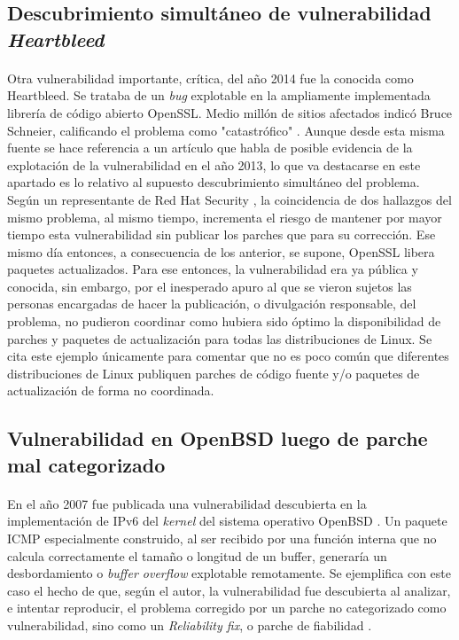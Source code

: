 \documentclass[11pt,a4paper]{article}
\begin{document}
\subsection{Descubrimiento simultáneo de vulnerabilidad \textit{Heartbleed}}

\paragraph{}Otra vulnerabilidad importante, crítica, del año 2014 fue la conocida como Heartbleed. Se trataba de un \textit{bug} explotable en la ampliamente implementada librería de código abierto OpenSSL. Medio millón de sitios afectados indicó Bruce Schneier, calificando el problema como "catastrófico" \cite{SchneierHB}. Aunque desde esta misma fuente se hace referencia a un artículo que habla de posible evidencia de la explotación de la vulnerabilidad en el año 2013, lo que va destacarse en este apartado es lo relativo al supuesto descubrimiento simultáneo del problema. Según un representante de Red Hat Security \cite{cox1}, la coincidencia de dos hallazgos del mismo problema, al mismo tiempo, incrementa el riesgo de mantener por mayor tiempo esta vulnerabilidad sin publicar los parches que para su corrección. Ese mismo día entonces, a consecuencia de los anterior, se supone, OpenSSL libera paquetes actualizados. Para ese entonces, la vulnerabilidad era ya pública y conocida, sin embargo, por el inesperado apuro al que se vieron sujetos las personas encargadas de hacer la publicación, o divulgación responsable, del problema, no pudieron coordinar como hubiera sido óptimo la disponibilidad de parches y paquetes de actualización para todas las distribuciones de Linux. Se cita este ejemplo únicamente para comentar que no es poco común que diferentes distribuciones de Linux publiquen parches de código fuente y/o paquetes de actualización de forma no coordinada.

\subsection{Vulnerabilidad en OpenBSD luego de parche mal categorizado}

\paragraph{}En el año 2007 fue publicada una vulnerabilidad descubierta en la implementación de IPv6 del \textit{kernel} del sistema operativo OpenBSD \cite{openbsd1}. Un paquete ICMP especialmente construido, al ser recibido por una función interna que no calcula correctamente el tamaño o longitud de un buffer, generaría un desbordamiento o \textit{buffer overflow} explotable remotamente. Se ejemplifica con este caso el hecho de que, según el autor, la vulnerabilidad fue descubierta al analizar, e intentar reproducir, el problema corregido por un parche no categorizado como vulnerabilidad, sino como un \textit{Reliability fix}, o parche de fiabilidad \cite{openbsd2}.
\end{document}
